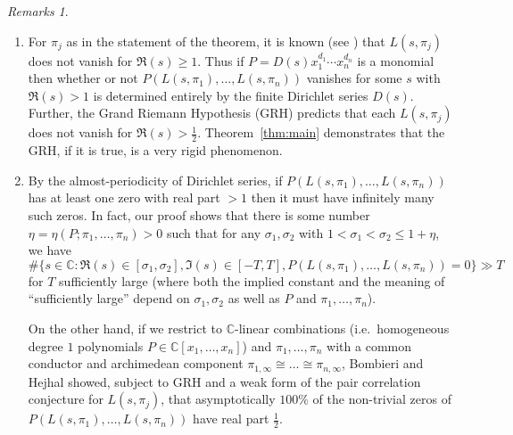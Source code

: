 \documentclass[11pt]{amsart}
\theoremstyle{remark}
\newtheorem*{remarks}{Remarks}
\numberwithin{theorem}{section}
\numberwithin{equation}{section}
\newcommand{\C}{\mathbb{C}}
\begin{document}
\begin{remarks}\hspace{1cm}
\begin{enumerate}
\item For $\pi_j$ as in the statement of the theorem, it is known
(see \cite{jacquet-shalika}) that $L(s,\pi_j)$ does not vanish for
$\Re(s)\ge1$. Thus if $P=D(s)x_1^{d_1}\cdots x_n^{d_n}$ is a monomial
then whether or not $P(L(s,\pi_1),\ldots,L(s,\pi_n))$ vanishes
for some $s$ with $\Re(s)>1$ is determined entirely by the finite
Dirichlet series $D(s)$.  Further, the Grand Riemann Hypothesis (GRH)
predicts that each $L(s,\pi_j)$ does not vanish for $\Re(s)>\frac12$.
Theorem~\ref{thm:main} demonstrates that the GRH, if it is true,
is a very rigid phenomenon.

\item By the almost-periodicity of Dirichlet series, if
$P(L(s,\pi_1),\ldots,L(s,\pi_n))$ has at least one zero with real part $>1$
then it must have infinitely many such zeros. In fact, our proof shows
that there is some number $\eta=\eta(P;\pi_1,\ldots,\pi_n)>0$ such that
for any $\sigma_1,\sigma_2$ with $1<\sigma_1<\sigma_2\le1+\eta$, we have
\begin{equation}\label{eqn:Nlowerbound}
\#\bigl\{s\in\C:\Re(s)\in[\sigma_1,\sigma_2], \Im(s)\in[-T,T],
P(L(s,\pi_1),\ldots,L(s,\pi_n))=0\bigr\}
\gg T
\end{equation}
for $T$ sufficiently large (where both the implied constant and the
meaning of ``sufficiently large'' depend on $\sigma_1,\sigma_2$
as well as $P$ and $\pi_1,\ldots,\pi_n$).

On the other hand, if we restrict to $\C$-linear combinations
(i.e.\ homogeneous degree $1$ polynomials $P\in\C[x_1,\ldots,x_n]$)
and $\pi_1,\ldots,\pi_n$ with a common conductor and archimedean
component $\pi_{1,\infty}\cong\ldots\cong\pi_{n,\infty}$, Bombieri and
Hejhal \cite{bh} showed, subject to GRH and a weak form of the pair
correlation conjecture for $L(s,\pi_j)$, that asymptotically $100\%$
of the non-trivial zeros of $P(L(s,\pi_1),\ldots,L(s,\pi_n))$ have real
part $\frac12$.


\end{enumerate}
\end{remarks}
\end{document}
